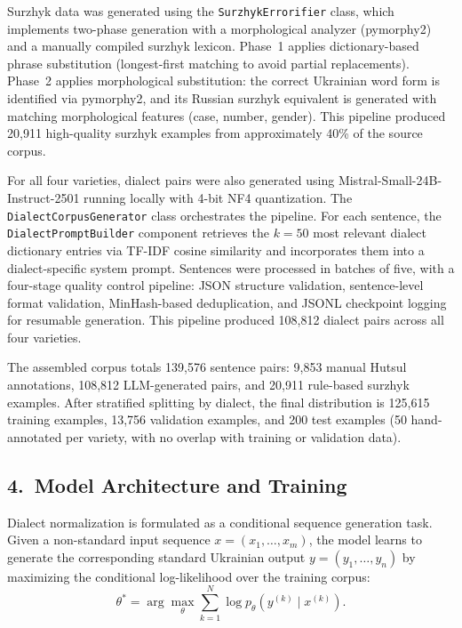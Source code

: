 \documentclass[14pt]{extarticle}
\begin{document}
Surzhyk data was generated using the \texttt{SurzhykErrorifier} class, which implements two-phase
generation with a morphological analyzer (pymorphy2) and a manually compiled surzhyk lexicon.
Phase~1 applies dictionary-based phrase substitution (longest-first matching to avoid partial
replacements). Phase~2 applies morphological substitution: the correct Ukrainian word form is
identified via pymorphy2, and its Russian surzhyk equivalent is generated with matching
morphological features (case, number, gender). This pipeline produced 20,911 high-quality surzhyk
examples from approximately 40\% of the source corpus.

For all four varieties, dialect pairs were also generated using Mistral-Small-24B-Instruct-2501
running locally with 4-bit NF4 quantization. The \texttt{DialectCorpusGenerator} class
orchestrates the pipeline. For each sentence, the \texttt{DialectPromptBuilder} component
retrieves the $k = 50$ most relevant dialect dictionary entries via TF-IDF cosine similarity and
incorporates them into a dialect-specific system prompt. Sentences were processed in batches of
five, with a four-stage quality control pipeline: JSON structure validation, sentence-level format
validation, MinHash-based deduplication, and JSONL checkpoint logging for resumable generation.
This pipeline produced 108,812 dialect pairs across all four varieties.

The assembled corpus totals 139,576 sentence pairs: 9,853 manual Hutsul annotations, 108,812
LLM-generated pairs, and 20,911 rule-based surzhyk examples. After stratified splitting by dialect,
the final distribution is 125,615 training examples, 13,756 validation examples, and 200 test
examples (50 hand-annotated per variety, with no overlap with training or validation data).

\subsection*{4.~Model Architecture and Training}

Dialect normalization is formulated as a conditional sequence generation task. Given a non-standard
input sequence $x = (x_1, \ldots, x_m)$, the model learns to generate the corresponding standard
Ukrainian output $y = (y_1, \ldots, y_n)$ by maximizing the conditional log-likelihood over the
training corpus:
\begin{equation}
\theta^{*} = \arg\max_{\theta} \sum_{k=1}^{N} \log p_{\theta}(y^{(k)} \mid x^{(k)}).
\label{eq:abs_mle}
\end{equation}
\end{document}
